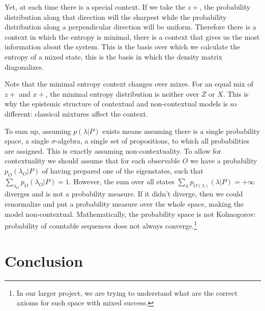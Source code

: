 \documentclass[10pt,twocolumn, nofootinbib]{revtex4-2}
\begin{document}
Yet, at each time there is a special context. If we take the $z+$, the probability distribution along that direction will the sharpest while the probability distribution along a perpendicular direction will be uniform. Therefore there is a context in which the entropy is minimal, there is a context that gives us the most information about the system. This is the basis over which we calculate the entropy of a mixed state, this is the basis in which the density matrix diagonalizes.

Note that the minimal entropy context changes over mixes. For an equal mix of $z+$ and $x+$, the minimal entropy distribution is neither over $Z$ or $X$. This is why the epistemic structure of contextual and non-contextual models is so different: classical mixtures affect the context.

To sum up, assuming $p(\lambda|P)$ exists means assuming there is a single probability space, a single $\sigma$-algebra, a single set of propositions, to which all probabilities are assigned. This is exactly assuming non-contextuality. To allow for contextuality we should assume that for each observable $O$ we have a probability $p_O(\lambda_O|P)$ of having prepared one of the eigenstates, such that $\sum_{\lambda_O} p_O(\lambda_O|P) = 1$. However, the sum over all states $\sum_{\lambda} p_{O(\lambda)}(\lambda|P) = + \infty$ diverges and is not a probability measure. If it didn't diverge, then we could renormalize and put a probability measure over the whole space, making the model non-contextual. Mathematically, the probability space is not Kolmogorov: probability of countable sequences does not always converge.\footnote{In our larger project, we are trying to understand what are the correct axioms for such space with mixed success.}




\section{Conclusion}


\end{document}

